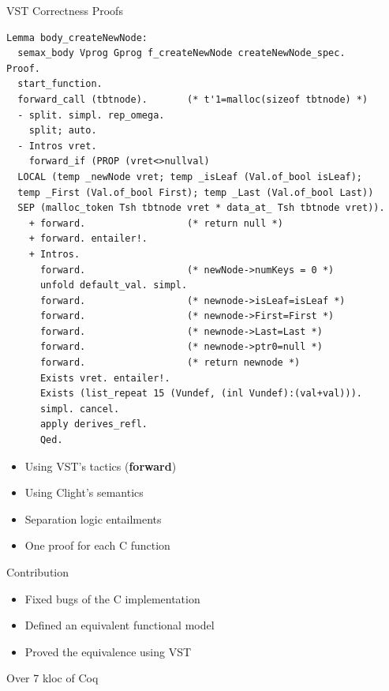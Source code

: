 \documentclass[usenames,dvipsnames]{beamer}
\def\subsep{\vspace{1cm}}
\begin{document}
\begin{frame}[fragile]
\begin{columns}[T]
\begin{column}{.23\textwidth}
  \begin{block}{VST Correctness Proofs}
    \begin{lstlisting}[language=Coq,basicstyle=\scriptsize]
Lemma body_createNewNode:
  semax_body Vprog Gprog f_createNewNode createNewNode_spec.
Proof.
  start_function.
  forward_call (tbtnode).       (* t'1=malloc(sizeof tbtnode) *)
  - split. simpl. rep_omega.
    split; auto.
  - Intros vret.
    forward_if (PROP (vret<>nullval)
  LOCAL (temp _newNode vret; temp _isLeaf (Val.of_bool isLeaf);
  temp _First (Val.of_bool First); temp _Last (Val.of_bool Last))
  SEP (malloc_token Tsh tbtnode vret * data_at_ Tsh tbtnode vret)).
    + forward.                  (* return null *)
    + forward. entailer!.
    + Intros. 
      forward.                  (* newNode->numKeys = 0 *)
      unfold default_val. simpl.
      forward.                  (* newnode->isLeaf=isLeaf *)
      forward.                  (* newnode->First=First *)
      forward.                  (* newnode->Last=Last *)
      forward.                  (* newnode->ptr0=null *)
      forward.                  (* return newnode *)
      Exists vret. entailer!.
      Exists (list_repeat 15 (Vundef, (inl Vundef):(val+val))).
      simpl. cancel.
      apply derives_refl.
      Qed.
    \end{lstlisting}
    \subsep
    
    \begin{itemize}
    \item Using VST's tactics (\textbf{forward})
    \item Using Clight's semantics
    \item Separation logic entailments
    \item One proof for each C function
    \end{itemize}
\end{block}

\begin{block}{Contribution}
  \begin{itemize}
  \item Fixed bugs of the C implementation
  \item Defined an equivalent functional model
  \item Proved the equivalence using VST
  \end{itemize}
  \subsep
  
  Over 7 kloc of Coq
\end{block}


\end{column}
\end{columns}
\end{frame}
\end{document}
